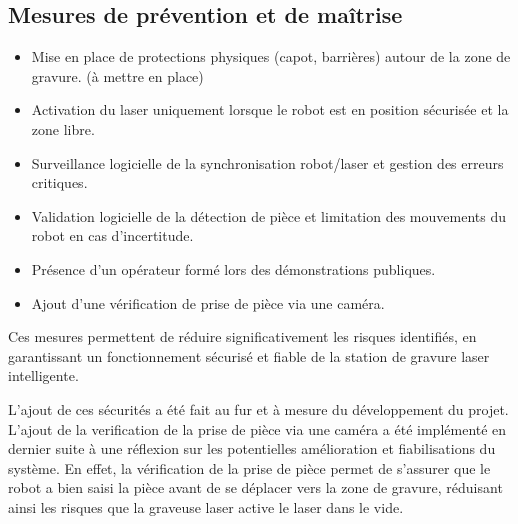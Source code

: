 \subsection{Mesures de prévention et de maîtrise}
\begin{itemize}
    \item Mise en place de protections physiques (capot, barrières) autour de la zone de gravure. (à mettre en place)
    \item Activation du laser uniquement lorsque le robot est en position sécurisée et la zone libre.
    \item Surveillance logicielle de la synchronisation robot/laser et gestion des erreurs critiques.
    \item Validation logicielle de la détection de pièce et limitation des mouvements du robot en cas d'incertitude.
    \item Présence d'un opérateur formé lors des démonstrations publiques.
    \item Ajout d'une vérification de prise de pièce via une caméra.
\end{itemize}

Ces mesures permettent de réduire significativement les risques identifiés, en garantissant un fonctionnement sécurisé et fiable de la station de gravure laser intelligente.

L'ajout de ces sécurités a été fait au fur et à mesure du développement du projet. L'ajout de la verification de la prise de pièce via une caméra a été implémenté en dernier suite à une réflexion sur les potentielles amélioration et fiabilisations du système. En effet, la vérification de la prise de pièce permet de s'assurer que le robot a bien saisi la pièce avant de se déplacer vers la zone de gravure, réduisant ainsi les risques que la graveuse laser active le laser dans le vide.
